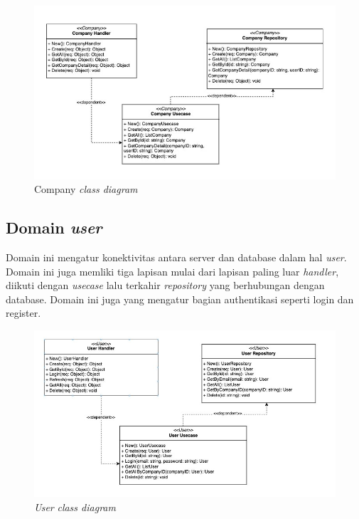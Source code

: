 \begin{figure}[ht]
  \centering
  \includegraphics[width=1\textwidth]{resources/chapter-3/class/company-class-diagram.jpg}
  \caption{Company \textit{class diagram}}
  \label{fig:company-class-diagram}
\end{figure}

\pagebreak

\subsection{Domain \textit{user}}

Domain ini mengatur konektivitas antara server dan database dalam hal \textit{user}. Domain ini juga memliki tiga lapisan mulai dari lapisan paling luar \textit{handler}, diikuti dengan \textit{usecase} lalu terkahir \textit{repository} yang berhubungan dengan database. Domain ini juga yang mengatur bagian authentikasi seperti login dan register.

\begin{figure}[ht]
  \centering
  \includegraphics[width=1\textwidth]{resources/chapter-3/class/user-class-diagram.jpg}
  \caption{\textit{User} \textit{class diagram}}
  \label{fig:user-class-diagram}
\end{figure}

